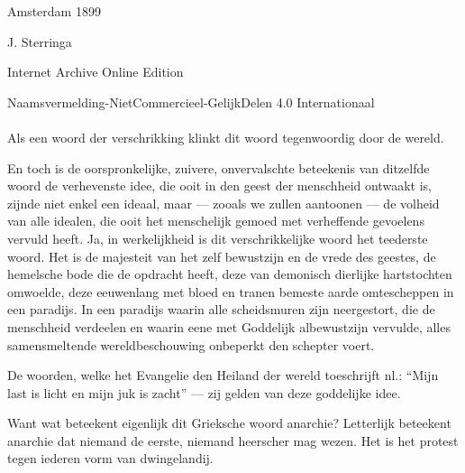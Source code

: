 \documentclass[a4paper, 12pt, oneside, dutch]{article}
\begin{document}
\begin{titlepage}
	
		
	\vspace*{\fill}%
	
	Amsterdam 1899 %
	
	{\small J. Sterringa } %

	\vspace{1\baselineskip} %

        Internet Archive Online Edition  %
	
	{\small Naamsvermelding-NietCommercieel-GelijkDelen 4.0 Internationaal } %
\end{titlepage}
\setlength{\parskip}{1mm plus1mm minus1mm}
\clearpage
\pagestyle{fancy}
\fancyhf{}
\cfoot{\Fontauri{\thepage}}
\Large
\paragraph{}
Als een woord der verschrikking klinkt dit woord tegenwoordig door de wereld.

En toch is de oorspronkelijke, zuivere, onvervalschte beteekenis van ditzelfde woord de verhevenste idee, die ooit in den geest der menschheid ontwaakt is, zijnde niet enkel een ideaal, maar --- zooals we zullen aantoonen --- de volheid van alle idealen, die ooit het menschelijk gemoed met verheffende gevoelens vervuld heeft. Ja, in werkelijkheid is dit verschrikkelijke woord het teederste woord. Het is de majesteit van het zelf bewustzijn en de vrede des geestes, de hemelsche bode die de opdracht heeft, deze van demonisch dierlijke hartstochten omwoelde, deze eeuwenlang met bloed en tranen bemeste aarde omtescheppen in een paradijs. In een paradijs waarin alle scheidsmuren zijn neergestort, die de menschheid verdeelen en waarin eene met Goddelijk albewustzijn vervulde, alles samensmeltende wereldbeschouwing onbeperkt den schepter voert.

De woorden, welke het Evangelie den Heiland der wereld toeschrijft nl.: "`Mijn last is licht en mijn juk is zacht"' --- zij gelden van deze goddelijke idee.

Want wat beteekent eigenlijk dit Grieksche woord anarchie? Letterlijk beteekent anarchie dat niemand de eerste, niemand heerscher mag wezen.
Het is het protest tegen iederen vorm van dwingelandij.
\end{document}
